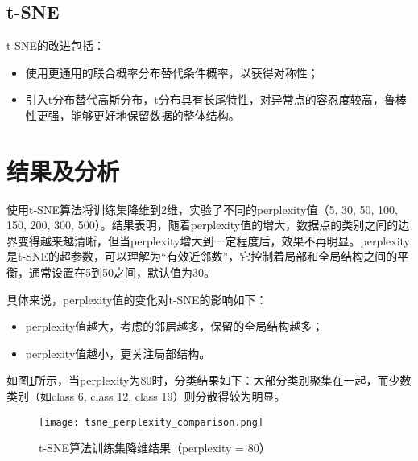 \documentclass[a4paper,12pt]{article}
\begin{document}
\subsection{t-SNE}
t-SNE的改进包括：
\begin{itemize}
    \item 使用更通用的联合概率分布替代条件概率，以获得对称性；
    \item 引入t分布替代高斯分布，t分布具有长尾特性，对异常点的容忍度较高，鲁棒性更强，能够更好地保留数据的整体结构。
\end{itemize}

\section{结果及分析}

使用t-SNE算法将训练集降维到2维，实验了不同的perplexity值（5, 30, 50, 100, 150, 200, 300, 500）。结果表明，随着perplexity值的增大，数据点的类别之间的边界变得越来越清晰，但当perplexity增大到一定程度后，效果不再明显。perplexity是t-SNE的超参数，可以理解为“有效近邻数”，它控制着局部和全局结构之间的平衡，通常设置在5到50之间，默认值为30。

具体来说，perplexity值的变化对t-SNE的影响如下：
\begin{itemize}
    \item perplexity值越大，考虑的邻居越多，保留的全局结构越多；
    \item perplexity值越小，更关注局部结构。
\end{itemize}

如图\ref{fig:tsne}所示，当perplexity为80时，分类结果如下：大部分类别聚集在一起，而少数类别（如class 6, class 12, class 19）则分散得较为明显。

\begin{figure}[h!]
    \centering
    \texttt{[image: tsne\_perplexity\_comparison.png]}  %
    \caption{t-SNE算法训练集降维结果（perplexity = 80）}
    \label{fig:tsne}
\end{figure}
\end{document}
